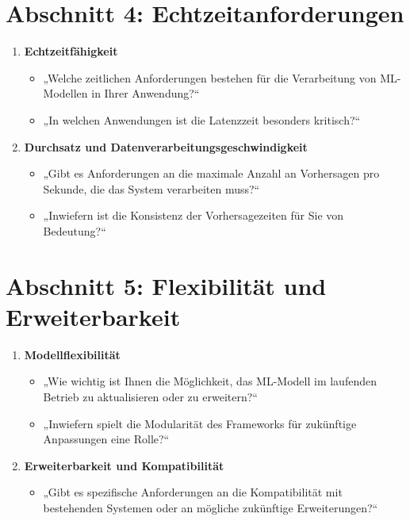 \section*{Abschnitt 4: Echtzeitanforderungen}
\begin{enumerate}
    \item \textbf{Echtzeitfähigkeit}
    \begin{itemize}
        \item „Welche zeitlichen Anforderungen bestehen für die Verarbeitung von ML-Modellen in Ihrer Anwendung?“
        \item „In welchen Anwendungen ist die Latenzzeit besonders kritisch?“
    \end{itemize}
    \item \textbf{Durchsatz und Datenverarbeitungsgeschwindigkeit}
    \begin{itemize}
        \item „Gibt es Anforderungen an die maximale Anzahl an Vorhersagen pro Sekunde, die das System verarbeiten muss?“
        \item „Inwiefern ist die Konsistenz der Vorhersagezeiten für Sie von Bedeutung?“
    \end{itemize}
\end{enumerate}

\section*{Abschnitt 5: Flexibilität und Erweiterbarkeit}
\begin{enumerate}
    \item \textbf{Modellflexibilität}
    \begin{itemize}
        \item „Wie wichtig ist Ihnen die Möglichkeit, das ML-Modell im laufenden Betrieb zu aktualisieren oder zu erweitern?“
        \item „Inwiefern spielt die Modularität des Frameworks für zukünftige Anpassungen eine Rolle?“
    \end{itemize}
    \item \textbf{Erweiterbarkeit und Kompatibilität}
    \begin{itemize}
        \item „Gibt es spezifische Anforderungen an die Kompatibilität mit bestehenden Systemen oder an mögliche zukünftige Erweiterungen?“
    \end{itemize}
\end{enumerate}

